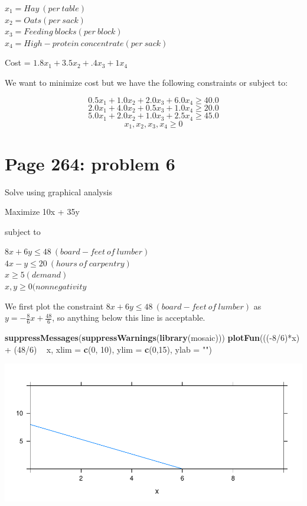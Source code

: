 \documentclass[]{article}
\newenvironment{Shaded}{\begin{snugshade}}{\end{snugshade}}
\newcommand{\KeywordTok}[1]{\textcolor[rgb]{0.13,0.29,0.53}{\textbf{{#1}}}}
\newcommand{\DataTypeTok}[1]{\textcolor[rgb]{0.13,0.29,0.53}{{#1}}}
\newcommand{\DecValTok}[1]{\textcolor[rgb]{0.00,0.00,0.81}{{#1}}}
\newcommand{\StringTok}[1]{\textcolor[rgb]{0.31,0.60,0.02}{{#1}}}
\newcommand{\NormalTok}[1]{{#1}}
\begin{document}
\(x_1 = Hay~(per~table)\)\\
\(x_2 = Oats(per~sack)\)\\
\(x_3 = Feeding~blocks(per~block)\)\\
\(x_4 = High-protein~concentrate(per~sack)\)

Cost = \(1.8x_1 + 3.5x_2 + .4x_3 + 1x_4\)

We want to minimize cost but we have the following constraints or
subject to:

\[0.5x_1 + 1.0x_2 + 2.0x_3 + 6.0x_4 \geq 40.0\]
\[2.0x_1 + 4.0x_2 + 0.5x_3 + 1.0x_4 \geq 20.0\]
\[5.0x_1 + 2.0x_2 + 1.0x_3 + 2.5x_4 \geq 45.0\]
\[x_1, x_2, x_3, x_4 \geq 0\]

\section{Page 264: problem 6}\label{page-264-problem-6}

Solve using graphical analysis

Maximize 10x + 35y

subject to

\(8x + 6y \leq 48 ~(board-feet~of~lumber)\)\\
\(4x - y \leq 20 ~ (hours~of~carpentry)\)\\
\(x \geq 5 (demand)\)\\
\(x,y \geq 0 (nonnegativity\)

We first plot the constraint \(8x + 6y \leq 48 ~(board-feet~of~lumber)\)
as \(y = -\frac{8}{6}x + \frac{48}{6}\), so anything below this line is
acceptable.

\begin{Shaded}
\begin{Highlighting}[]
\KeywordTok{suppressMessages}\NormalTok{(}\KeywordTok{suppressWarnings}\NormalTok{(}\KeywordTok{library}\NormalTok{(mosaic)))}
\KeywordTok{plotFun}\NormalTok{(((-}\DecValTok{8}\NormalTok{/}\DecValTok{6}\NormalTok{)*x) +}\StringTok{ }\NormalTok{(}\DecValTok{48}\NormalTok{/}\DecValTok{6}\NormalTok{) ~}\StringTok{ }\NormalTok{x, }\DataTypeTok{xlim =} \KeywordTok{c}\NormalTok{(}\DecValTok{0}\NormalTok{, }\DecValTok{10}\NormalTok{), }\DataTypeTok{ylim =} \KeywordTok{c}\NormalTok{(}\DecValTok{0}\NormalTok{,}\DecValTok{15}\NormalTok{), }\DataTypeTok{ylab =} \StringTok{""}\NormalTok{)}
\end{Highlighting}
\end{Shaded}

\includegraphics{Christophe_Hunt_hw6_files/figure-latex/unnamed-chunk-1-1.pdf}
\end{document}
